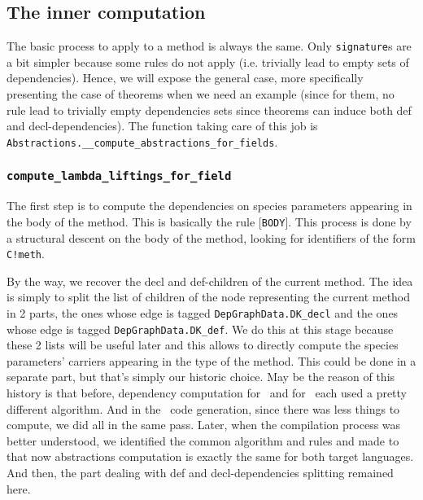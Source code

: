 \subsection{The inner computation}
The basic process to apply to a method is always the same. Only
{\tt signature}s are a bit simpler because some rules do not apply
(i.e. trivially lead to empty sets of dependencies). Hence, we will
expose the general case, more specifically presenting the case of
theorems when we need an example (since for them, no rule lead to
trivially empty dependencies sets since theorems can induce both def
and decl-dependencies). The function taking care of this job is
{\tt Abstractions.\_\_compute\_abstractions\_for\_fields}.


\subsubsection{{\tt compute\_lambda\_liftings\_for\_field}}
The first step is to compute the dependencies on species parameters
appearing in the body of the method. This is basically the rule
[{\tt BODY}]. This process is done by a structural descent on the body
of the method, looking for identifiers of the form {\tt C!meth}.

\medskip
By the way, we recover the decl and def-children of the current
method. The idea is simply to split the list of children of the node
representing the current method in 2 parts, the ones whose edge is
tagged {\tt DepGraphData.DK\_decl} and the ones whose edge is tagged
{\tt DepGraphData.DK\_def}. We do this at this stage because these 2
lists will be useful later and this allows to directly compute the
species parameters' carriers appearing in the type of the method. This
could be done in a separate part, but that's simply our historic
choice. May be the reason of this history is that before, dependency
computation for \ocaml\ and for \coq\ each used a pretty different
algorithm. And in the \ocaml\ code generation, since there was less
things to compute, we did all in the same pass. Later, when the
compilation process was better understood, we identified the common
algorithm and rules and made to that now abstractions computation is
exactly the same for both target languages. And then, the part dealing
with def and decl-dependencies splitting remained here.

